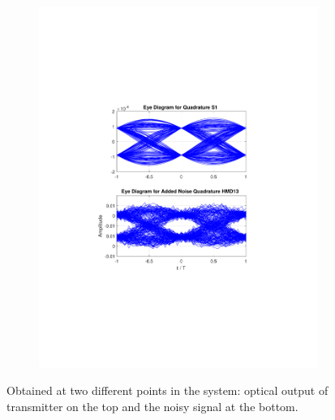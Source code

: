 \begin{figure}[H]
\begin{minipage}{\linewidth}
\begin{subfigure}{.45\textwidth}
		\includegraphics[clip, trim=5cm 7cm 5cm 7cm, width=\textwidth]{./sdf/m_qam_system/figures/eyes/q_n_nmf_45_60_rc.pdf}
	\end{subfigure}
	
	\caption{
		Obtained
		at two different points in the system: optical output of transmitter on the top and
		the noisy signal at the bottom.
		\label{fig:eyes_n_rc_45_03}}
	\end{minipage}
\end{figure}
